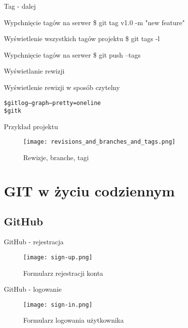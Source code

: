 \documentclass{beamer}
\begin{document}
\begin{frame}{Tag - dalej}
\begin{block}{Wypchnięcie tagów na serwer}
\$ git tag v1.0 -m "new feature"
\end{block}
\vskip 0.5cm
\begin{block}{Wyświetlenie wszystkich tagów projektu}
\$ git tags -l
\end{block}
\begin{block}{Wypchnięcie tagów na serwer}
\$ git push --tags
\end{block}
\end{frame}

\begin{frame}{Wyświetlanie rewizji}
\begin{block}{Wyświetlenie rewizji w sposób czytelny}
\begin{alltt}
\$ git log --graph --pretty=oneline \\
\$ gitk
\end{alltt}
\end{block}
\end{frame}

\begin{frame}{Przykład projektu}
	\begin{figure}
	\texttt{[image: revisions\_and\_branches\_and\_tags.png]}
	\caption{\label{Branches}Rewizje, branche, tagi}
	\end{figure}
\end{frame}


\section{GIT w życiu codziennym}

\subsection{GitHub}

\begin{frame}{GitHub - rejestracja}
	\begin{figure}
	\texttt{[image: sign-up.png]}
	\caption{\label{fig:sign-up}Formularz rejestracji konta}
	\end{figure}
\end{frame}

\begin{frame}{GitHub - logowanie}
	\begin{figure}
	\texttt{[image: sign-in.png]}
	\caption{\label{fig:sign-in}Formularz logowania użytkownika}
	\end{figure}
\end{frame}
\end{document}
